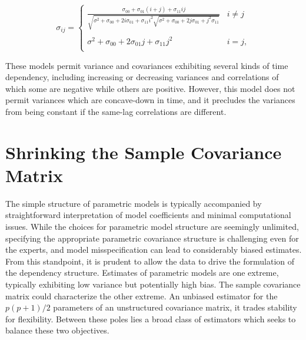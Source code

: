 \begin{equation}
\sigma_{ij} = \left\{ \begin{array}{ll}
\frac{\sigma_{00} + \sigma_{01}\left(i + j\right) + \sigma_{11} ij}{\sqrt{\sigma^2 + \sigma_{00} + 2i\sigma_{01} + \sigma_{11}i^2\sqrt{\sigma^2 + \sigma_{00} + 2j\sigma_{01} +j^2\sigma_{11}} }} &  i \ne j \\ 
& \\
\sigma^2 + \sigma_{00} + 2\sigma_{01}j + \sigma_{11}j^2 &  i= j, \\
\end{array}\right.
\end{equation}

These models permit variance and covariances exhibiting several kinds of time dependency, including increasing or decreasing variances and correlations of which some are negative while others are positive. However, this model does not permit variances which are concave-down in time, and it precludes the variances from being constant if the same-lag correlations are different.
%
%



\section{Shrinking the Sample Covariance Matrix} \label{chapter-1-shrinking-the-sample-cov}

The simple structure of parametric models is typically accompanied by straightforward interpretation of model coefficients and minimal computational issues. While the choices for parametric model structure are seemingly unlimited, specifying the appropriate parametric covariance structure is challenging even for the experts, and model misspecification can lead to considerably biased estimates. From this standpoint, it is prudent to allow the data to drive the formulation of the dependency structure. Estimates of parametric models are one extreme, typically exhibiting low variance but potentially high bias. The sample covariance matrix could characterize the other extreme. An unbiased estimator for the $p\left(p+1\right)/2$ parameters of an unstructured covariance matrix, it trades stability for flexibility. Between these poles lies a broad class of estimators which seeks to balance these two objectives.


